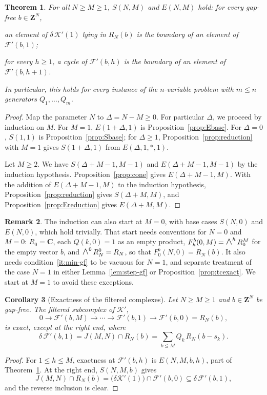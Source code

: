 \documentclass[12pt]{amsart}
\newtheorem{theorem}{Theorem}[section]
\newtheorem{corollary}[theorem]{Corollary}
\theoremstyle{definition}
\newtheorem{remark1}[theorem]{Remark}
\theoremstyle{remark}
\newcommand{\BC}{\mathbf C}
\newcommand{\Z}{\mathbf Z}
\newcommand{\K}{\mathcal K}
\newcommand{\FF}{\mathcal F}
\newcommand{\LL}{\mathcal K} %
\newcommand{\WedgeAux}[2]{\scalebox{1.35}{$#1\wedge$}}
\newcommand{\Wedge}{\mathop{\mathpalette\WedgeAux\relax}\nolimits}
\begin{document}
\begin{theorem}\label{thm:induction}
  For all $N \geq M \ge 1$, $S(N, M)$ and $E(N,M)$ hold: for every gap-free
  $b\in\Z^N$,
  \begin{thmlist}
  \item an element of $\delta\, \K'(1)$ lying in $R_N(b)$ is
  the boundary of an element of $\FF'(b, 1)$;
  \item for every $h \geq 1$, a cycle of $\FF'(b,h)$ is
  the boundary of an element of $\FF'(b,h+1)$.
  \end{thmlist}
  In particular, this holds for every instance of the $n$-variable problem
  with $m \le n$ generators $Q_1,\dots,Q_m$.
\end{theorem}
\begin{proof}
Map the parameter $N$ to $\Delta = N-M \geq 0$.
For particular $\Delta$, we proceed by induction on $M$.
For $M=1$, $E(1+\Delta,1)$ is Proposition~\ref{prop:Ebase}.
For $\Delta=0$, $S(1,1)$ is Proposition~\ref{prop:Sbase}; for $\Delta\geq1$,
Proposition~\ref{prop:reduction} with $M=1$ gives $S(1+\Delta,1)$ from
$E(\Delta,1,*,1)$.

Let $M\ge2$.
We have $S(\Delta+M-1, M-1)$ and $E(\Delta+M-1,M-1)$ by the induction
hypothesis.
Proposition~\ref{prop:cone} gives $E(\Delta+M-1,M)$.  
With the addition of $E(\Delta+M-1,M)$ to the induction hypothesis,
Proposition~\ref{prop:reduction} gives $S(\Delta+M,M)$, and
Proposition~\ref{prop:Ereduction} gives $E(\Delta+M,M)$.
\end{proof}

\begin{remark1}\label{rem:Mzero}
The induction can also start at $M=0$, with base cases $S(N,0)$ and $E(N,0)$,
which hold trivially.  That start needs conventions for $N=0$ and $M=0$:
$R_0=\BC$, each $Q(k,0)=1$ as an empty product,
$F^b_h(0,M)=\Wedge^h R_0^M$ for the empty vector $b$,
and $\Wedge^0 R_N^0=R_N$, so that $F^b_0(N,0)=R_N(b)$.  It also needs
condition~\ref{it:min-gf} to be vacuous for $N=1$, and separate treatment
of the case $N=1$ in either Lemma~\ref{lem:step-gf} or
Proposition~\ref{prop:tcexact}.
We start at $M=1$ to avoid these exceptions.
\end{remark1}

\begin{corollary}[Exactness of the filtered complexes]\label{cor:filterexact}
  Let $N \geq M \ge1$ and $b\in \Z^N$ be gap-free.
The filtered subcomplex of $\K'$,
\[
0\to \FF'(b, M) \to\cdots\to \FF'(b, 1)\to \FF'(b, 0) =R_N(b),
\]
is exact, except at the right end, where
\[
\delta\, \FF'(b, 1) = J(M, N) \cap R_N(b)=\sum_{k\le M}Q_k\,R_N(b-s_k).
\]
\end{corollary}
\begin{proof}
For $1\le h\le M$, exactness at $\FF'(b,h)$ is $E(N,M,b,h)$, part of
Theorem~\ref{thm:induction}.
At the right end, $S(N,M, b)$ gives
  \[
  J(M, N) \cap R_N(b)=\bigl( \delta\LL'(1) \bigr)\cap \FF'(b, 0)
  \subseteq\delta\, \FF'(b, 1),
  \]
  and the
  reverse inclusion is clear.
\end{proof}
\end{document}
